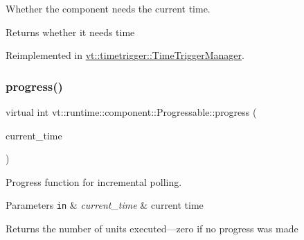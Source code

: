 Whether the component needs the current time. 

\begin{DoxyReturn}{Returns}
whether it needs time 
\end{DoxyReturn}


Reimplemented in \hyperlink{structvt_1_1timetrigger_1_1_time_trigger_manager_a2e65cfcbbbb1224b08263996b0fb1eff}{vt\+::timetrigger\+::\+Time\+Trigger\+Manager}.

\mbox{\label{structvt_1_1runtime_1_1component_1_1_progressable_a75f1e623643f2273835fdf047d3d0cd3}} 
\subsubsection{\texorpdfstring{progress()}{progress()}}
{\footnotesize\ttfamily virtual int vt\+::runtime\+::component\+::\+Progressable\+::progress (\begin{DoxyParamCaption}\item[{\hyperlink{namespacevt_a876a9d0cd5a952859c72de8a46881442}{Time\+Type}}]{current\+\_\+time }\end{DoxyParamCaption})\hspace{0.3cm}{\ttfamily [pure virtual]}}



Progress function for incremental polling. 


\begin{DoxyParams}[1]{Parameters}
\mbox{\tt in}  & {\em current\+\_\+time} & current time\\
\hline
\end{DoxyParams}
\begin{DoxyReturn}{Returns}
the number of units executed---zero if no progress was made 
\end{DoxyReturn}


